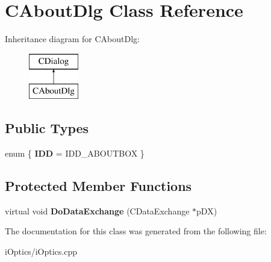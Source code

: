 \hypertarget{class_c_about_dlg}{}\section{C\+About\+Dlg Class Reference}
\label{class_c_about_dlg}
Inheritance diagram for C\+About\+Dlg\+:\begin{figure}[H]
\begin{center}
\leavevmode
\includegraphics[height=2.000000cm]{class_c_about_dlg}
\end{center}
\end{figure}
\subsection*{Public Types}
\begin{DoxyCompactItemize}
\item 
\mbox{\label{class_c_about_dlg_a68823db74a70b5e165bcd5e108852ce4}} 
enum \{ {\bfseries I\+DD} = I\+D\+D\+\_\+\+A\+B\+O\+U\+T\+B\+OX
 \}
\end{DoxyCompactItemize}
\subsection*{Protected Member Functions}
\begin{DoxyCompactItemize}
\item 
\mbox{\label{class_c_about_dlg_ab83db7484fec957282d7d5a21aed4df4}} 
virtual void {\bfseries Do\+Data\+Exchange} (C\+Data\+Exchange $\ast$p\+DX)
\end{DoxyCompactItemize}


The documentation for this class was generated from the following file\+:\begin{DoxyCompactItemize}
\item 
i\+Optics/i\+Optics.\+cpp\end{DoxyCompactItemize}
